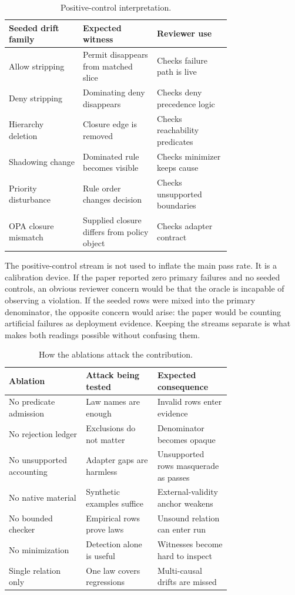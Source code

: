 \documentclass[10pt,conference]{IEEEtran}
\begin{document}
\begin{table}[t]
\centering
\caption{Positive-control interpretation.}
\label{tab:positivecontrol}
\begin{tabular}{p{0.25\linewidth}p{0.25\linewidth}p{0.25\linewidth}}
\toprule
Seeded drift family & Expected witness & Reviewer use \\
\midrule
Allow stripping & Permit disappears from matched slice & Checks failure path is live \\
Deny stripping & Dominating deny disappears & Checks deny precedence logic \\
Hierarchy deletion & Closure edge is removed & Checks reachability predicates \\
Shadowing change & Dominated rule becomes visible & Checks minimizer keeps cause \\
Priority disturbance & Rule order changes decision & Checks unsupported boundaries \\
OPA closure mismatch & Supplied closure differs from policy object & Checks adapter contract \\
\bottomrule
\end{tabular}
\end{table}

The positive-control stream is not used to inflate the main pass rate.  It is a calibration device.  If the paper reported zero primary failures and no seeded controls, an obvious reviewer concern would be that the oracle is incapable of observing a violation.  If the seeded rows were mixed into the primary denominator, the opposite concern would arise: the paper would be counting artificial failures as deployment evidence.  Keeping the streams separate is what makes both readings possible without confusing them.

\begin{table}[t]
\centering
\caption{How the ablations attack the contribution.}
\label{tab:ablationattacks}
\begin{tabular}{p{0.27\linewidth}p{0.25\linewidth}p{0.23\linewidth}}
\toprule
Ablation & Attack being tested & Expected consequence \\
\midrule
No predicate admission & Law names are enough & Invalid rows enter evidence \\
No rejection ledger & Exclusions do not matter & Denominator becomes opaque \\
No unsupported accounting & Adapter gaps are harmless & Unsupported rows masquerade as passes \\
No native material & Synthetic examples suffice & External-validity anchor weakens \\
No bounded checker & Empirical rows prove laws & Unsound relation can enter run \\
No minimization & Detection alone is useful & Witnesses become hard to inspect \\
Single relation only & One law covers regressions & Multi-causal drifts are missed \\
\bottomrule
\end{tabular}
\end{table}
\end{document}
